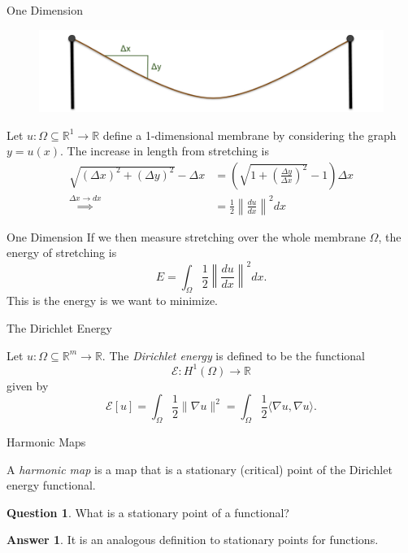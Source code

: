 \documentclass[usenames,dvipsnames]{beamer}
\theoremstyle{definition}
\newtheorem*{question}{Question}
\newtheorem*{answer}{Answer}
\theoremstyle{theorem}
\newcommand{\R}{\mathbb{R}}
\begin{document}
        \begin{frame}{One Dimension}
            \begin{figure}
                \centering
                \includegraphics[width=.95\textwidth]{images/Dirichlet_Energy.png}
            \end{figure}
            Let $u\colon \Omega \subseteq \R^1 \to \R$ define a 1-dimensional membrane by considering the graph $y=u(x)$. The increase in length from stretching is
            \begin{align*}
                \sqrt{(\Delta x)^2+(\Delta y)^2}-\Delta x &= \left(\sqrt{1 + \left( \frac{\Delta     y}{\Delta x}\right)^2} - 1\right)\Delta x\\
                \stackrel{\Delta x \to dx}{\implies}&= \frac{1}{2}\left\|\frac{du}{dx}\right\|^2dx
            \end{align*}
        \end{frame}
        
        \begin{frame}{One Dimension}
            If we then measure stretching over the whole membrane $\Omega$, the energy of stretching is
            \[
            E=\int_\Omega \frac{1}{2} \left\|\frac{du}{dx}\right\|^2 dx.
            \]
            This is the energy is we want to minimize.
        \end{frame}
        
        \begin{frame}{The Dirichlet Energy}
            \begin{definition}
            Let $u\colon \Omega \subseteq \R^m \to \R$. The \emph{Dirichlet energy} is defined to be the functional
            \[
            \mathcal{E}\colon H^1(\Omega) \to \R
            \]
            given by
            \[
            \mathcal{E}[u]= \int_\Omega \frac{1}{2} \|\nabla u\|^2 = \int_\Omega \frac{1}{2} \langle \nabla u, \nabla u \rangle.
            \]  
            \end{definition}
        \end{frame}
        
        \begin{frame}{Harmonic Maps}
            \begin{definition}
            A \emph{harmonic map} is a map that is a stationary (critical) point of the Dirichlet energy functional.
            \end{definition}
            \pause
            \begin{question}
                What is a stationary point of a functional?
            \end{question}
            \pause
            \begin{answer}
                It is an analogous definition to stationary points for functions.
            \end{answer}
        \end{frame}
        
\end{document}
